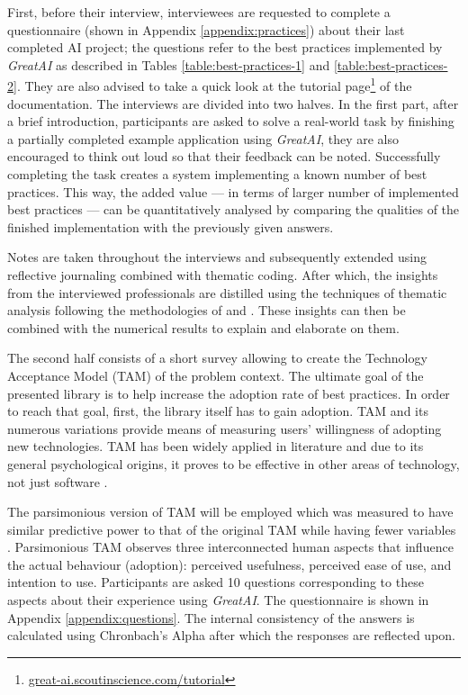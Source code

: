 First, before their interview, interviewees are requested to complete a questionnaire (shown in Appendix \ref{appendix:practices}) about their last completed AI project; the questions refer to the best practices implemented by \textit{GreatAI} as described in Tables \ref{table:best-practices-1} and \ref{table:best-practices-2}. They are also advised to take a quick look at the tutorial page\footnote{\href{https://great-ai.scoutinscience.com/tutorial/}{great-ai.scoutinscience.com/tutorial}} of the documentation. The interviews are divided into two halves. In the first part, after a brief introduction, participants are asked to solve a real-world task by finishing a partially completed example application using \textit{GreatAI}, they are also encouraged to think out loud so that their feedback can be noted. Successfully completing the task creates a system implementing a known number of best practices. This way, the added value --- in terms of larger number of implemented best practices --- can be quantitatively analysed by comparing the qualities of the finished implementation with the previously given answers. 

Notes are taken throughout the interviews and subsequently extended using reflective journaling \cite{halcomb2006verbatim} combined with thematic coding. After which, the insights from the interviewed professionals are distilled using the techniques of thematic analysis \cite{fereday2006demonstrating} following the methodologies of \cite{cruz2019catalog} and \cite{haakman2021ai}. These insights can then be combined with the numerical results to explain and elaborate on them. 

The second half consists of a short survey allowing to create the Technology Acceptance Model (TAM) \cite{davis1989perceived} of the problem context. The ultimate goal of the presented library is to help increase the adoption rate of best practices. In order to reach that goal, first, the library itself has to gain adoption. TAM and its numerous variations provide means of measuring users' willingness of adopting new technologies. TAM has been widely applied in literature \cite{marangunic2015technology} and due to its general psychological origins, it proves to be effective in other areas of technology, not just software \cite{riemenschneider2002explaining}. 

The parsimonious version of TAM will be employed which was measured to have similar predictive power to that of the original TAM while having fewer variables \cite{wu2011user}. Parsimonious TAM observes three interconnected human aspects that influence the actual behaviour (adoption): perceived usefulness, perceived ease of use, and intention to use. Participants are asked 10 questions corresponding to these aspects about their experience using \textit{GreatAI}. The questionnaire is shown in Appendix \ref{appendix:questions}. The internal consistency of the answers is calculated using Chronbach's Alpha \cite{bland1997statistics} after which the responses are reflected upon.

